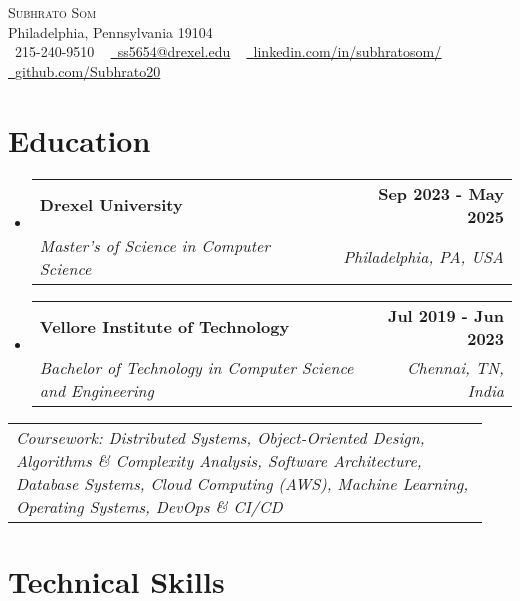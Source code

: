 \documentclass[letterpaper,11pt]{article}
\makeatletter
\newcommand{\resumeSubheading}[4]{
  \vspace{-2pt}\item
    \begin{tabular*}{1.0\textwidth}[t]{l@{\extracolsep{\fill}}r}
      \textbf{#1} & \textbf{\small #2} \\
      \textit{\small#3} & \textit{\small #4} \\
    \end{tabular*}\vspace{-7pt}
}
\newcommand{\resumeSubHeadingListStart}{\begin{itemize}[leftmargin=0.0in, label={}]}
\newcommand{\resumeSubHeadingListEnd}{\end{itemize}}
\makeatother
\begin{document}

\vspace{-16pt}
\begin{center}
    {\Huge \scshape Subhrato Som} \\ \vspace{1pt}
    Philadelphia, Pennsylvania 19104 \\ \vspace{1pt}
    \small \raisebox{-0.1\height}\faPhone\ 215-240-9510 ~ \href{mailto:ss5654@drexel.edu}{\raisebox{-0.2\height}\faEnvelope\  \underline{ss5654@drexel.edu}} ~ 
    \href{https://linkedin.com/in/subhratosom/}{\raisebox{-0.2\height}\faLinkedin\ \underline{linkedin.com/in/subhratosom/}}  ~
    \href{https://github.com/Subhrato20}{\raisebox{-0.2\height}\faGithub\ \underline{github.com/Subhrato20}}
    \vspace{-8pt}
\end{center}

\section{Education}
  \resumeSubHeadingListStart
  
    \resumeSubheading
      {Drexel University}{Sep 2023 - May 2025}
      {Master's of Science in Computer Science}{Philadelphia, PA, USA}

    \vspace{-5pt}
    \resumeSubheading
      {Vellore Institute of Technology}{Jul 2019 - Jun 2023}
      {Bachelor of Technology in Computer Science and Engineering}{Chennai, TN, India}
  
  \resumeSubHeadingListEnd
  \vspace{0.2em}
    \hspace{0.15in}\begin{tabular}{p{0.94\linewidth}}
    \textit{{Coursework}: Distributed Systems, Object-Oriented Design, Algorithms \& Complexity Analysis, Software Architecture, Database Systems, Cloud Computing (AWS), Machine Learning, Operating Systems, DevOps \& CI/CD}
\end{tabular}

\section{Technical Skills}
\end{document}
